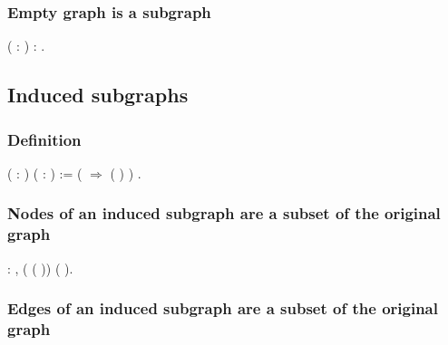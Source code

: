 \subsubsection{Empty graph is a subgraph}


\begin{coqdoccode}
\coqdocemptyline
\coqdocnoindent
{}  ( : ) :   .\coqdoceol
\coqdocemptyline
\end{coqdoccode}
\subsection{Induced subgraphs}

\subsubsection{Definition}


\begin{coqdoccode}
\coqdocemptyline
\coqdocnoindent
{}  ( : ) ( : ) :=\coqdoceol
\coqdocindent{1.00em}
 (    \ensuremath{\Rightarrow}        (  )   )  .\coqdoceol
\coqdocemptyline
\end{coqdoccode}
\subsubsection{Nodes of an induced subgraph are a subset of the original graph}


\begin{coqdoccode}
\coqdocnoindent
{}  : \coqdockw{\ensuremath{\forall}}  ,  ( (  )) ( ).\coqdoceol
\coqdocemptyline
\end{coqdoccode}
\subsubsection{Edges of an induced subgraph are a subset of the original graph}

